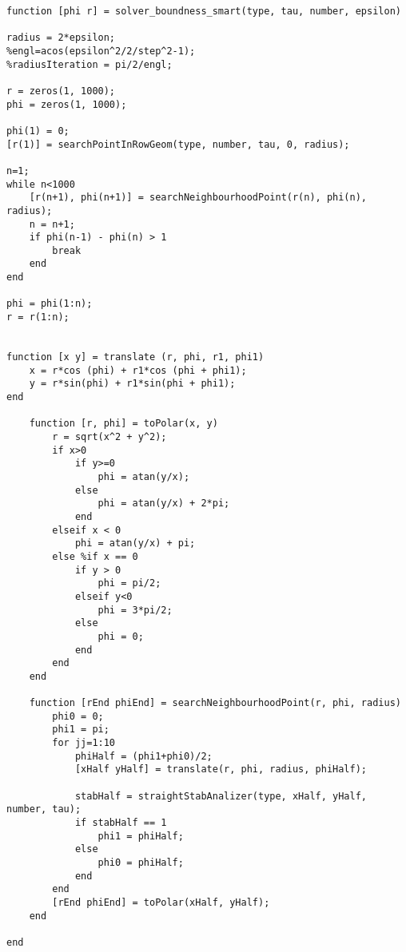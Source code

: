 \begin{verbatim}
function [phi r] = solver_boundness_smart(type, tau, number, epsilon)

radius = 2*epsilon;
%engl=acos(epsilon^2/2/step^2-1);
%radiusIteration = pi/2/engl;

r = zeros(1, 1000);
phi = zeros(1, 1000);

phi(1) = 0;
[r(1)] = searchPointInRowGeom(type, number, tau, 0, radius);

n=1;
while n<1000
    [r(n+1), phi(n+1)] = searchNeighbourhoodPoint(r(n), phi(n), radius);
    n = n+1;
    if phi(n-1) - phi(n) > 1
        break
    end
end

phi = phi(1:n);
r = r(1:n);


function [x y] = translate (r, phi, r1, phi1)
    x = r*cos (phi) + r1*cos (phi + phi1);
    y = r*sin(phi) + r1*sin(phi + phi1);
end

    function [r, phi] = toPolar(x, y)
        r = sqrt(x^2 + y^2);
        if x>0
            if y>=0
                phi = atan(y/x);
            else 
                phi = atan(y/x) + 2*pi;
            end
        elseif x < 0
            phi = atan(y/x) + pi;
        else %if x == 0
            if y > 0
                phi = pi/2;
            elseif y<0
                phi = 3*pi/2;
            else
                phi = 0;
            end
        end
    end

    function [rEnd phiEnd] = searchNeighbourhoodPoint(r, phi, radius)
        phi0 = 0;
        phi1 = pi;
        for jj=1:10
            phiHalf = (phi1+phi0)/2;
            [xHalf yHalf] = translate(r, phi, radius, phiHalf);
       
            stabHalf = straightStabAnalizer(type, xHalf, yHalf, number, tau);
            if stabHalf == 1
                phi1 = phiHalf;
            else
                phi0 = phiHalf;
            end
        end
        [rEnd phiEnd] = toPolar(xHalf, yHalf);
    end

end
\end{verbatim}
